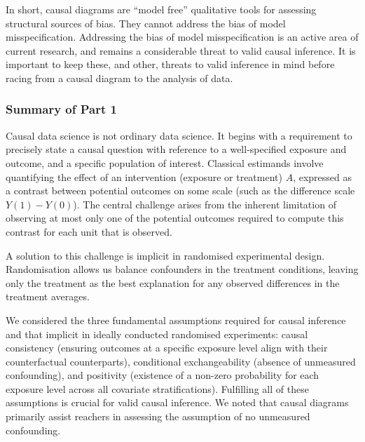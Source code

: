 \documentclass[
  singlecolumn,
  9pt]{article}
\begin{document}
In short, causal diagrams are ``model free'' qualitative tools for
assessing structural sources of bias. They cannot address the bias of
model misspecification. Addressing the bias of model misspecification is
an active area of current research, and remains a considerable threat to
valid causal inference. It is important to keep these, and other,
threats to valid inference in mind before racing from a causal diagram
to the analysis of data.

\subsubsection{Summary of Part 1}\label{summary-of-part-1}

Causal data science is not ordinary data science. It begins with a
requirement to precisely state a causal question with reference to a
well-specified exposure and outcome, and a specific population of
interest. Classical estimands involve quantifying the effect of an
intervention (exposure or treatment) \(A\), expressed as a contrast
between potential outcomes on some scale (such as the difference scale
\(Y(1) - Y(0)\)). The central challenge arises from the inherent
limitation of observing at most only one of the potential outcomes
required to compute this contrast for each unit that is observed.

A solution to this challenge is implicit in randomised experimental
design. Randomisation allows us balance confounders in the treatment
conditions, leaving only the treatment as the best explanation for any
observed differences in the treatment averages.

We considered the three fundamental assumptions required for causal
inference and that implicit in ideally conducted randomised experiments:
causal consistency (ensuring outcomes at a specific exposure level align
with their counterfactual counterparts), conditional exchangeability
(absence of unmeasured confounding), and positivity (existence of a
non-zero probability for each exposure level across all covariate
stratifications). Fulfilling all of these assumptions is crucial for
valid causal inference. We noted that causal diagrams primarily assist
reachers in assessing the assumption of no unmeasured confounding.
\end{document}
